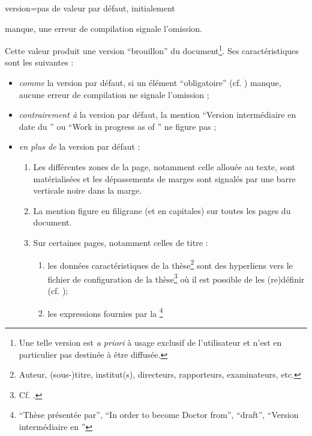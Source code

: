 {\begin{docKey}{version}{=\textbar{}\textbar{}\textbar{}\textbar{}\textbar{}}{pas
      de valeur par défaut, initialement }
\begin{description}
\begin{enumerate}
        manque, une erreur de compilation signale l'omission.
      \end{enumerate}
    \item[\docValue{draft}.]
      Cette valeur produit une version
      \enquote{brouillon} du document\footnote{Une telle version est \emph{a
          priori} à usage exclusif de l'utilisateur et n'est en particulier pas
        destinée à être diffusée.}. Ses caractéristiques sont les suivantes :
      \begin{itemize}
      \item \emph{comme} la version par défaut, si un élément
        \enquote{obligatoire} (cf. ) manque, aucune erreur
        de compilation ne signale l'omission ;
      \item \emph{contrairement à} la version par défaut, la mention
        \enquote{Version intermédiaire en date du } ou
        \foreignquote{english}{Work in progress as of } ne
        figure pas ;
      \item \emph{en plus de} la version par défaut :
        \begin{enumerate}
        \item Les différentes zones de la page, notamment celle allouée au
          texte, sont matérialisées et les dépassements de marges sont signalés
          par une barre verticale noire dans la marge.
        \item La mention  figure en
          filigrane (et en capitales) sur toutes les pages du
          document.
        \item Sur certaines pages, notamment celles de titre :
          \begin{enumerate}
          \item les données caractéristiques de la thèse\footnote{Auteur,
              (sous-)titre, institut(s), directeurs, rapporteurs, examinateurs,
              etc.} sont des hyperliens vers le fichier de configuration de la
            thèse\footnote{Cf. .} où il est possible de
            les (re)définir (cf. );
          \item\label{item-expression} les expressions fournies par la
            \yatCl{}\footnote{\enquote{Thèse présentée par},
              \foreignquote{english}{In order to become Doctor from},
              \foreignquote{english}{draft}, \enquote{Version intermédiaire en
}}
\end{enumerate}
\end{enumerate}
\end{itemize}
\end{description}
\end{docKey}}
